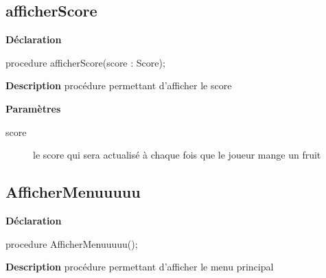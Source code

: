 \documentclass{report}
\newif\ifpdf
\begin{document}
\subsection*{afficherScore}
\fi
\label{Affichage-afficherScore}
\begin{list}{}{
\setlength{\itemindent}{0cm}
\setlength{\listparindent}{0cm}
\setlength{\leftmargin}{\evensidemargin}
\addtolength{\leftmargin}{\tmplength}
\settowidth{\labelsep}{X}
\addtolength{\leftmargin}{\labelsep}
\setlength{\labelwidth}{\tmplength}
}
\item[\textbf{Déclaration}\hfill]
\ifpdf
\begin{flushleft}
\fi
\begin{ttfamily}
procedure afficherScore(score : Score);\end{ttfamily}

\ifpdf
\end{flushleft}
\fi

\par
\item[\textbf{Description}]
procédure permettant d'afficher le score \par
\item[\textbf{Paramètres}]
\begin{description}
\item[score] le score qui sera actualisé à chaque fois que le joueur mange un fruit
\end{description}


\end{list}
\ifpdf
\subsection*{\large{\textbf{AfficherMenuuuuu}}\normalsize\hspace{1ex}\hrulefill}
\else
\subsection*{AfficherMenuuuuu}
\fi
\label{Affichage-AfficherMenuuuuu}
\begin{list}{}{
\setlength{\itemindent}{0cm}
\setlength{\listparindent}{0cm}
\setlength{\leftmargin}{\evensidemargin}
\addtolength{\leftmargin}{\tmplength}
\settowidth{\labelsep}{X}
\addtolength{\leftmargin}{\labelsep}
\setlength{\labelwidth}{\tmplength}
}
\item[\textbf{Déclaration}\hfill]
\ifpdf
\begin{flushleft}
\fi
\begin{ttfamily}
procedure AfficherMenuuuuu();\end{ttfamily}

\ifpdf
\end{flushleft}
\fi

\par
\item[\textbf{Description}]
procédure permettant d'afficher le menu principal

\end{list}
\ifpdf
\end{document}
